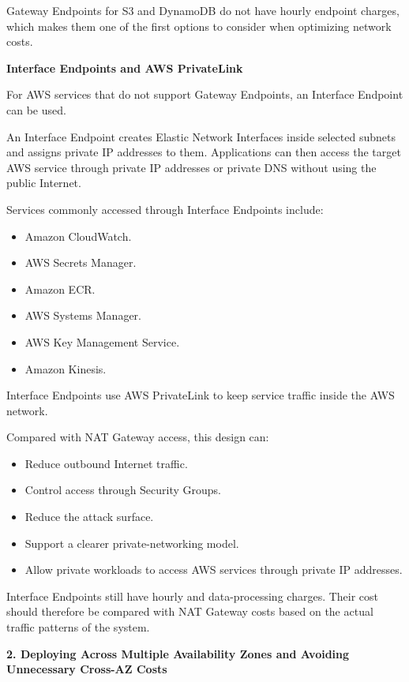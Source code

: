 Gateway Endpoints for S3 and DynamoDB do not have hourly endpoint
charges, which makes them one of the first options to consider when
optimizing network costs.

\vspace{0.5em}\noindent\textbf{Interface Endpoints and AWS
PrivateLink}\par

For AWS services that do not support Gateway Endpoints, an Interface
Endpoint can be used.

An Interface Endpoint creates Elastic Network Interfaces inside selected
subnets and assigns private IP addresses to them. Applications can then
access the target AWS service through private IP addresses or private
DNS without using the public Internet.

Services commonly accessed through Interface Endpoints include:

\begin{itemize}
\tightlist
\item
  Amazon CloudWatch.
\item
  AWS Secrets Manager.
\item
  Amazon ECR.
\item
  AWS Systems Manager.
\item
  AWS Key Management Service.
\item
  Amazon Kinesis.
\end{itemize}

Interface Endpoints use AWS PrivateLink to keep service traffic inside
the AWS network.

Compared with NAT Gateway access, this design can:

\begin{itemize}
\tightlist
\item
  Reduce outbound Internet traffic.
\item
  Control access through Security Groups.
\item
  Reduce the attack surface.
\item
  Support a clearer private-networking model.
\item
  Allow private workloads to access AWS services through private IP
  addresses.
\end{itemize}

Interface Endpoints still have hourly and data-processing charges. Their
cost should therefore be compared with NAT Gateway costs based on the
actual traffic patterns of the system.

\vspace{0.5em}\noindent\textbf{2. Deploying Across Multiple Availability Zones and Avoiding
Unnecessary Cross-AZ
Costs}\par

